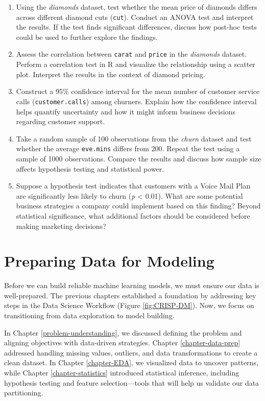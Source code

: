 \documentclass[
]{book}
\newcommand{\passthrough}[1]{#1}
\theoremstyle{definition}
\theoremstyle{definition}
\theoremstyle{definition}
\theoremstyle{definition}
\theoremstyle{remark}
\begin{document}
\begin{enumerate}
\item
  Using the \emph{diamonds} dataset, test whether the mean price of diamonds differs across different diamond cuts (\passthrough{\lstinline!cut!}). Conduct an ANOVA test and interpret the results. If the test finds significant differences, discuss how post-hoc tests could be used to further explore the findings.
\item
  Assess the correlation between \passthrough{\lstinline!carat!} and \passthrough{\lstinline!price!} in the \emph{diamonds} dataset. Perform a correlation test in R and visualize the relationship using a scatter plot. Interpret the results in the context of diamond pricing.
\item
  Construct a 95\% confidence interval for the mean number of customer service calls (\passthrough{\lstinline!customer.calls!}) among churners. Explain how the confidence interval helps quantify uncertainty and how it might inform business decisions regarding customer support.
\item
  Take a random sample of 100 observations from the \emph{churn} dataset and test whether the average \passthrough{\lstinline!eve.mins!} differs from 200. Repeat the test using a sample of 1000 observations. Compare the results and discuss how sample size affects hypothesis testing and statistical power.
\item
  Suppose a hypothesis test indicates that customers with a Voice Mail Plan are significantly less likely to churn (\emph{p} \textless{} 0.01). What are some potential business strategies a company could implement based on this finding? Beyond statistical significance, what additional factors should be considered before making marketing decisions?
\end{enumerate}

\chapter{Preparing Data for Modeling}\label{chapter-modeling}

Before we can build reliable machine learning models, we must ensure our data is well-prepared. The previous chapters established a foundation by addressing key steps in the Data Science Workflow (Figure \ref{fig:CRISP-DM}). Now, we focus on transitioning from data exploration to model building.

In Chapter \ref{problem-understanding}, we discussed defining the problem and aligning objectives with data-driven strategies. Chapter \ref{chapter-data-prep} addressed handling missing values, outliers, and data transformations to create a clean dataset. In Chapter \ref{chapter-EDA}, we visualized data to uncover patterns, while Chapter \ref{chapter-statistics} introduced statistical inference, including hypothesis testing and feature selection---tools that will help us validate our data partitioning.
\end{document}
